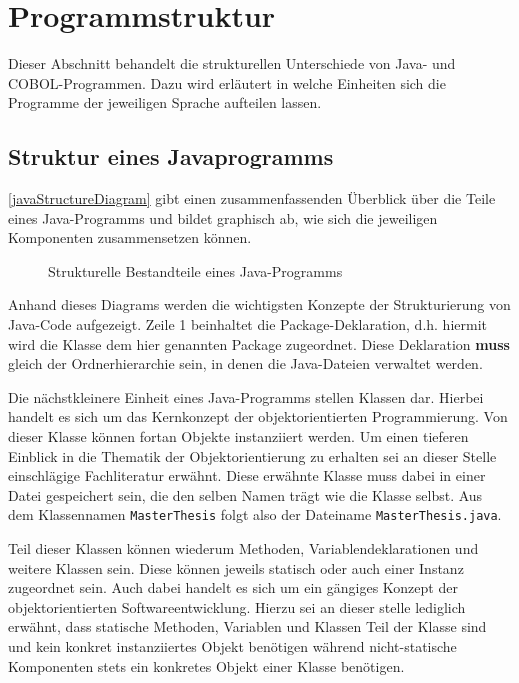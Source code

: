 \section{Programmstruktur}\label{sec:structure}
Dieser Abschnitt behandelt die strukturellen Unterschiede von Java- und COBOL-Programmen. Dazu wird erläutert in welche Einheiten sich die Programme der jeweiligen Sprache aufteilen lassen. 

\subsection*{Struktur eines Javaprogramms}
\autoref{javaStructureDiagram} gibt einen zusammenfassenden Überblick über die Teile eines Java-Programms und bildet graphisch ab, wie sich die jeweiligen Komponenten zusammensetzen können.

\begin{figure}[H]
    \centering
    \resizebox{.9\linewidth}{!}{\unskip}
    \caption{Strukturelle Bestandteile eines Java-Programms \label{javaStructureDiagram}}
\end{figure}

Anhand dieses Diagrams werden die wichtigsten Konzepte der Strukturierung von Java-Code aufgezeigt. Zeile 1 beinhaltet die Package-Deklaration, d.h. hiermit wird die Klasse dem hier genannten Package zugeordnet. Diese Deklaration \textbf{muss} gleich der Ordnerhierarchie sein, in denen die Java-Dateien verwaltet werden. 

Die nächstkleinere Einheit eines Java-Programms stellen Klassen dar. Hierbei handelt es sich um das Kernkonzept der objektorientierten Programmierung. Von dieser Klasse können fortan Objekte instanziiert werden. Um einen tieferen Einblick in die Thematik der Objektorientierung zu erhalten sei an dieser Stelle einschlägige Fachliteratur erwähnt. Diese erwähnte Klasse muss dabei in einer Datei gespeichert sein, die den selben Namen trägt wie die Klasse selbst. Aus dem Klassennamen \texttt{MasterThesis} folgt also der Dateiname \texttt{MasterThesis.java}.

Teil dieser Klassen können wiederum Methoden, Variablendeklarationen und weitere Klassen sein. Diese können jeweils statisch oder auch einer Instanz zugeordnet sein. Auch dabei handelt es sich um ein gängiges Konzept der objektorientierten Softwareentwicklung. Hierzu sei an dieser stelle lediglich erwähnt, dass statische Methoden, Variablen und Klassen Teil der Klasse sind und kein konkret instanziiertes Objekt benötigen während nicht-statische Komponenten stets ein konkretes Objekt einer Klasse benötigen.

